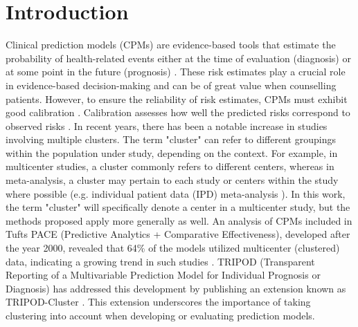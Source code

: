 \newpage

\section{Introduction}
Clinical prediction models (\glspl{CPM}) are evidence-based tools that estimate the probability of health-related events either at the time of evaluation (diagnosis) or at some point in the future (prognosis) \cite{steyerbergClinicalPredictionModels2009,vansmedenClinicalPredictionModels2021}. These risk estimates play a crucial role in evidence-based decision-making and can be of great value when counselling patients. However, to ensure the reliability of risk estimates, \glspl{CPM} must exhibit good calibration \cite{vancalsterCalibrationHierarchyRisk2016}. Calibration assesses how well the predicted risks correspond to observed risks \cite{vancalsterCalibrationHierarchyRisk2016}. In recent years, there has been a notable increase in studies involving multiple clusters. The term "cluster" can refer to different groupings within the population under study, depending on the context. For example, in multicenter studies, a cluster commonly refers to different centers, whereas in meta-analysis, a cluster may pertain to each study or centers within the study where possible (e.g. individual patient data (\gls{IPD}) meta-analysis \cite{rileyIndividualParticipantData2021a}). In this work, the term "cluster" will specifically denote a center in a multicenter study, but the methods proposed apply more generally as well. An analysis of \glspl{CPM} included in Tufts PACE (Predictive Analytics + Comparative Effectiveness), developed after the year 2000, revealed that 64\% of the models utilized multicenter (clustered) data, indicating a growing trend in such studies \cite{wynantsUntappedPotentialMulticenter2019,wesslerTuftsPACEClinical2017}. \gls{TRIPOD} (Transparent Reporting of a Multivariable Prediction Model for Individual Prognosis or Diagnosis) has addressed this development by publishing an extension known as \gls{TRIPOD}-Cluster \cite{debrayTransparentReportingMultivariable2023}. This extension underscores the importance of taking clustering into account when developing or evaluating prediction models.

